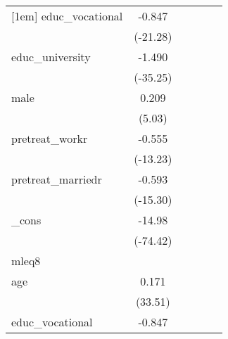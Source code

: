 {\begin{tabular}{l*{5}{c}}
[1em]
educ\_vocational&      -0.847\sym{***}&                     &                     &                     &                     \\
            &    (-21.28)         &                     &                     &                     &                     \\
[1em]
educ\_university&      -1.490\sym{***}&                     &                     &                     &                     \\
            &    (-35.25)         &                     &                     &                     &                     \\
[1em]
male        &       0.209\sym{***}&                     &                     &                     &                     \\
            &      (5.03)         &                     &                     &                     &                     \\
[1em]
pretreat\_workr&      -0.555\sym{***}&                     &                     &                     &                     \\
            &    (-13.23)         &                     &                     &                     &                     \\
[1em]
pretreat\_marriedr&      -0.593\sym{***}&                     &                     &                     &                     \\
            &    (-15.30)         &                     &                     &                     &                     \\
[1em]
\_cons      &      -14.98\sym{***}&                     &                     &                     &                     \\
            &    (-74.42)         &                     &                     &                     &                     \\
\hline
mleq8       &                     &                     &                     &                     &                     \\
age         &       0.171\sym{***}&                     &                     &                     &                     \\
            &     (33.51)         &                     &                     &                     &                     \\
[1em]
educ\_vocational&      -0.847\sym{***}&                     &                     &                     &                     \\

\end{tabular}}
